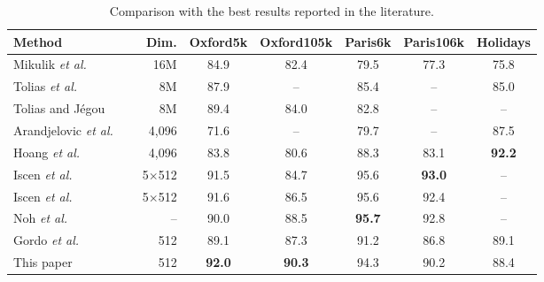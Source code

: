 \documentclass[journal]{IEEEtran}
\begin{document}
\begin{table*}[t]
\begin{center}
\caption{Comparison with the best results reported in the literature. }\label{comparison_with_best}
\begin{tabular}{|l|r| c c c c c|}
  \hline
  Method                                          &~~Dim.  &Oxford5k  &Oxford105k  &Paris6k  &Paris106k &Holidays \\
  \hline
  \hline
  Mikulik \textit{et al.}~\cite{mikulik2013learning}       &16M        &84.9    &82.4     &79.5     &77.3   &75.8\\
  Tolias \textit{et al.}~\cite{tolias2013aggregate}        &8M        &87.9    &--       &85.4     &--     &85.0\\
  Tolias and J{\'e}gou~\cite{tolias2015visual}    &8M        &89.4    &84.0     &82.8     &--     &--  \\
  Arandjelovic \textit{et al.}~\cite{arandjelovic2016netvlad}&4,096 &71.6    &--       &79.7     &--     &87.5\\
  Hoang \textit{et al.}~\cite{hoang2017selective}          &4,096   &83.8    &80.6     &88.3     &83.1   &\textbf{92.2}\\
  Iscen \textit{et al.}~\cite{iscen2017efficient}          &5$\times$512   &91.5    &84.7     &95.6     &\textbf{93.0}    &--\\
  Iscen \textit{et al.}~\cite{iscen2017fast}               &5$\times$512   &91.6    &86.5     &95.6    &92.4 &--\\
  Noh \textit{et al.}~\cite{noh2017largescale}             &--             &90.0    &88.5     &\textbf{95.7}    &92.8  &--\\
  Gordo \textit{et al.}~\cite{gordo2016deep}                &512     &89.1    &87.3     &91.2     &86.8    &89.1\\
  \hline
  This paper                                        &512    &\textbf{92.0}  &\textbf{90.3}     &94.3     &90.2     &88.4\\
  \hline
\end{tabular}
\end{center}
\end{table*}
\end{document}
